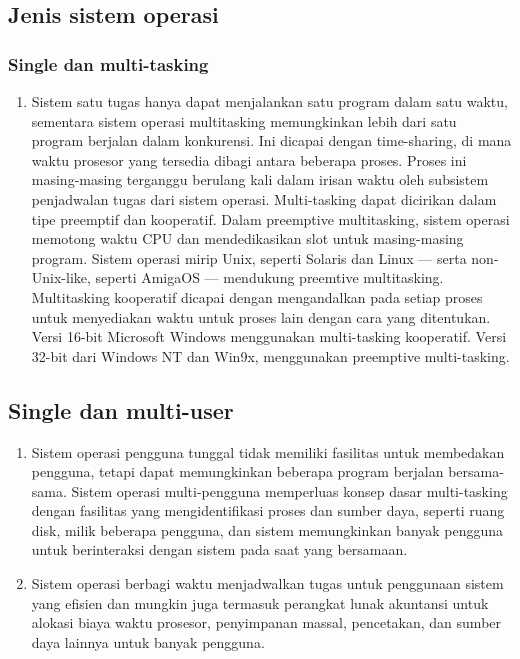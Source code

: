 \subsection{Jenis sistem operasi}
\subsubsection{Single dan multi-tasking}
	\begin{enumerate}
		\item Sistem satu tugas hanya dapat menjalankan satu program dalam satu waktu, sementara sistem operasi multitasking memungkinkan lebih dari satu program berjalan dalam konkurensi. Ini dicapai dengan time-sharing, di mana waktu prosesor yang tersedia dibagi antara beberapa proses. Proses ini masing-masing terganggu berulang kali dalam irisan waktu oleh subsistem penjadwalan tugas dari sistem operasi. Multi-tasking dapat dicirikan dalam tipe preemptif dan kooperatif. Dalam preemptive multitasking, sistem operasi memotong waktu CPU dan mendedikasikan slot untuk masing-masing program. Sistem operasi mirip Unix, seperti Solaris dan Linux — serta non-Unix-like, seperti AmigaOS — mendukung preemtive multitasking. Multitasking kooperatif dicapai dengan mengandalkan pada setiap proses untuk menyediakan waktu untuk proses lain dengan cara yang ditentukan. Versi 16-bit Microsoft Windows menggunakan multi-tasking kooperatif. Versi 32-bit dari Windows NT dan Win9x, menggunakan preemptive multi-tasking.
	\end{enumerate}
\subsection{Single dan multi-user}
	\begin{enumerate}
		\item Sistem operasi pengguna tunggal tidak memiliki fasilitas untuk membedakan pengguna, tetapi dapat memungkinkan beberapa program berjalan bersama-sama. Sistem operasi multi-pengguna memperluas konsep dasar multi-tasking dengan fasilitas yang mengidentifikasi proses dan sumber daya, seperti ruang disk, milik beberapa pengguna, dan sistem memungkinkan banyak pengguna untuk berinteraksi dengan sistem pada saat yang bersamaan. 
		\item Sistem operasi berbagi waktu menjadwalkan tugas untuk penggunaan sistem yang efisien dan mungkin juga termasuk perangkat lunak akuntansi untuk alokasi biaya waktu prosesor, penyimpanan massal, pencetakan, dan sumber daya lainnya untuk banyak pengguna.
	\end{enumerate}

